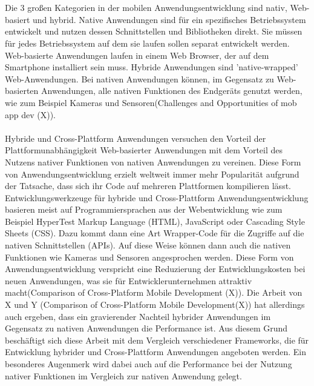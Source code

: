 \\
\\
Die 3 großen Kategorien in der mobilen Anwendungsentwicklung sind nativ, Web-basiert und hybrid. Native Anwendungen sind für ein spezifisches Betriebssystem entwickelt und nutzen dessen Schnittstellen und Bibliotheken direkt. Sie müssen für jedes Betriebssystem auf dem sie laufen sollen separat entwickelt werden. Web-basierte Anwendungen laufen in einem Web Browser, der auf dem Smartphone installiert sein muss. Hybride Anwendungen sind 'native-wrapped' Web-Anwendungen. Bei nativen Anwendungen können, im Gegensatz zu Web-basierten Anwendungen, alle nativen Funktionen des Endgeräts genutzt werden, wie zum Beispiel Kameras und Sensoren(Challenges and Opportunities of mob app dev (X)). 
\\
\\
Hybride und Cross-Plattform Anwendungen versuchen den Vorteil der Plattformunabhängigkeit Web-basierter Anwendungen mit dem Vorteil des Nutzens nativer Funktionen von nativen Anwendungen zu vereinen. Diese Form von Anwendungsentwicklung erzielt weltweit immer mehr Popularität aufgrund der Tatsache, dass sich ihr Code auf mehreren Plattformen kompilieren lässt. Entwicklungswerkzeuge für hybride und Cross-Plattform Anwendungsentwicklung basieren meist auf Programmiersprachen aus der Webentwicklung wie zum Beispiel HyperTest Markup Language (HTML), JavaScript oder Cascading Style Sheets (CSS). Dazu kommt dann eine Art Wrapper-Code für die Zugriffe auf die nativen Schnittstellen (APIs). Auf diese Weise können dann auch die nativen Funktionen wie Kameras und Sensoren angesprochen werden. Diese Form von Anwendungsentwicklung verspricht eine Reduzierung der Entwicklungskosten bei neuen Anwendungen, was sie für Entwicklerunternehmen attraktiv macht(Comparison of Cross-Platform Mobile Development (X)). Die Arbeit von X und Y (Comparison of Cross-Platform Mobile Development(X)) hat allerdings auch ergeben, dass ein gravierender Nachteil hybrider Anwendungen im Gegensatz zu nativen Anwendungen die Performance ist. Aus diesem Grund beschäftigt sich diese Arbeit mit dem Vergleich verschiedener Frameworks, die für Entwicklung hybrider und Cross-Plattform Anwendungen angeboten werden. Ein besonderes Augenmerk wird dabei auch auf die Performance bei der Nutzung nativer Funktionen im Vergleich zur nativen Anwendung gelegt.